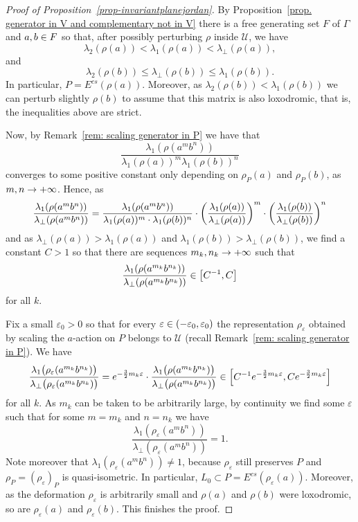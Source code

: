 \documentclass[AHL,Unicode,longabstracts]{cedram}
\newcommand{\scU}{\mathscr{U}}
\newcommand{\Ecs}{E^{cs}}
\newcommand{\eps}{\varepsilon}
\renewcommand*{\to}{\mathchoice{\longrightarrow}{\rightarrow}{\rightarrow}{\rightarrow}}
\let\originalleft\left
\let\originalright\right
\renewcommand{\left}{\mathopen{}\mathclose\bgroup\originalleft}
\renewcommand{\right}{\aftergroup\egroup\originalright}
\let\oldin\in
\renewcommand{\in}{\mathchoice{\oldin}{\oldin}{\,\oldin\,}{\,\oldin\,}}
\begin{document}
\begin{proof}[Proof of Proposition~\ref{prop-invariantplanejordan}]
By Proposition~\ref{prop. generator in V and complementary not in V} there is a free generating set $F$ of $\Gamma$ and $a,b\in F$ so that, after possibly perturbing $\rho$ inside $\scU$, we have
\[
\lambda_2(\rho(a)) < \lambda_1(\rho(a))< \lambda_\perp (\rho(a)),
\]
and
\[
\lambda_2(\rho(b))\leq \lambda_\perp(\rho(b))\leq \lambda_1 (\rho(b)).
\]
In particular, $P =\Ecs(\rho(a))$. Moreover, as $\lambda_2(\rho(b))< \lambda_1 (\rho(b))$ we can perturb slightly $\rho(b)$ to assume that this matrix is also loxodromic, that is, the inequalities above are strict.

Now, by Remark~\ref{rem: scaling generator in P} we have that
\[
\frac{\lambda_1 (\rho(a^{m}b^{n})) }{\lambda_1 (\rho(a))^{m}\lambda_1 (\rho(b))^{n}}
\]
converges to some positive constant only depending on $\rho_P(a)$ and $\rho_P(b)$, as $m,n\to+\infty$.
Hence, as
\[
\frac{ \lambda_1 (\rho(a^{m}b^{n})) }{\lambda_{\perp} (\rho(a^{m} b^{n}))}= \frac{\lambda_1 (\rho(a^{m}b^{n}))}{\lambda_1 (\rho(a))^{m}\cdot \lambda_1 (\rho(b))^{n}}\cdot\left(\frac{\lambda_1 (\rho(a))}{\lambda_\perp (\rho(a))}\right)^m\cdot \left(\frac{\lambda_1 (\rho(b))}{\lambda_\perp (\rho(b))}\right)^n
\]
and as $ \lambda_\perp (\rho(a)) > \lambda_1(\rho(a)) $ and $\lambda_1(\rho(b)) > \lambda_{\perp}(\rho(b))$, we find a constant $C>1$ so that there are sequences $m_k, n_k \to +\infty$ such that
\[
\frac{ \lambda_1 (\rho(a^{m_k}b^{n_k})) }{\lambda_{\perp} (\rho(a^{m_k} b^{n_k}))} \in \left[C^{-1}, C\right]
\]
for all $k$.

Fix a small $\eps_0>0$ so that for every $\eps\in(-\eps_0,\eps_0)$ the representation $\rho_\eps$ obtained by scaling the $a$-action on $P$ belongs to $\scU$ (recall Remark~\ref{rem: scaling generator in P}).
We have
\[
\frac{ \lambda_1 \bigl(\rho_\eps(a^{m_k}b^{n_k})\bigr) }{\lambda_{\perp} \bigl(\rho_\eps(a^{m_k} b^{n_k})\bigr)}=e^{-\frac{3}{2}m_k\eps}\cdot \frac{ \lambda_1 \bigl(\rho(a^{m_k}b^{n_k})\bigr) }{\lambda_{\perp} \bigl(\rho(a^{m_k} b^{n_k})\bigr)}\in\left[C^{-1}e^{-\frac{3}{2}m_k\eps},Ce^{-\frac{3}{2}m_k\eps}\right]
\]
for all $k$.
As $m_k$ can be taken to be arbitrarily large, by continuity we find some $\eps$ such that for some $m=m_k$ and $n=n_k$ we have
\[
\frac{ \lambda_1 (\rho_\eps(a^{m}b^{n})) }{\lambda_{\perp} (\rho_\eps(a^{m} b^{n}))}=1.
\]
Note moreover that $\lambda_1 (\rho_\eps(a^{m}b^{n}))\neq 1$, because $\rho_\eps$ still preserves $P$ and $\rho_P=(\rho_\eps)_P$ is quasi-isometric. In particular, $L_0\subset P=\Ecs(\rho_\eps(a))$. Moreover, as the deformation $\rho_\eps$ is arbitrarily small and $\rho(a)$ and $\rho(b)$ were loxodromic, so are $\rho_\eps(a)$ and $\rho_\eps(b)$. This finishes the proof.
\end{proof}
\end{document}
